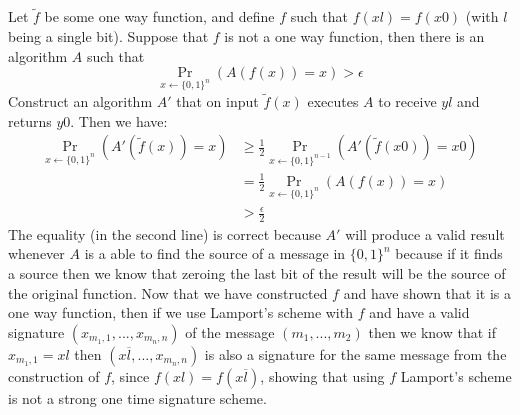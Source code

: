\documentclass{article}
\begin{document}
\section{}%
Let $\tilde{f}$ be some one way function, and define $f$ such that $f(xl) = f(x0)$ (with $l$ being a single bit).
Suppose that $f$ is not a one way function, then there is an algorithm $A$ such that 
\[\Pr_{x\leftarrow \{0,1\}^n}(A(f(x)) = x) > \epsilon\]
Construct an algorithm $A'$ that on input $\tilde{f}(x)$ executes $A$ to receive $yl$ and returns $y0$.
Then we have:
\begin{align*}
\Pr_{x\leftarrow \{0,1\}^n}(A'(\tilde{f}(x)) = x) &\geq \frac{1}{2}\Pr_{x\leftarrow \{0,1\}^{n-1}}(A'(\tilde{f}(x0)) = x0)\\
&= \frac{1}{2}\Pr_{x\leftarrow \{0,1\}^{n}}(A(f(x)) = x)\\
&>\frac{\epsilon}{2}
\end{align*}
The equality (in the second line) is correct because $A'$ will produce a valid result whenever $A$ is a able to find the source of a message in $\{0,1\}^{n}$ because if it finds a source then we know that zeroing the last bit of the result will be the source of the original function.
Now that we have constructed $f$ and have shown that it is a one way function, then if we use Lamport’s scheme with $f$ and have a valid signature $(x_{m_1, 1}, ..., x_{m_n, n})$ of the message $(m_1, ... , m_2)$ then we know that if $x_{m_1, 1} = xl$ then  $(x\overline{l}, ..., x_{m_n, n})$ is also a signature for the same message from the construction of $f$, since $f(xl) = f(x\overline{l})$, showing that using $f$ Lamport’s scheme is not a strong one time signature scheme.
\end{document}
